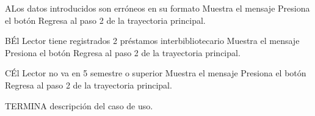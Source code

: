 		\begin{UCtrayectoriaA}{A}{Los datos introducidos son erróneos en su formato}
			\UCpaso[\UCsist] Muestra el mensaje 
			\UCpaso[\UCactor] Presiona el botón 
			\UCpaso[\UCsist] Regresa al paso 2 de la trayectoria principal.
		\end{UCtrayectoriaA}
		\begin{UCtrayectoriaA}{B}{Él Lector tiene registrados 2 préstamos interbibliotecario}
			\UCpaso[\UCsist] Muestra el mensaje 
			\UCpaso[\UCactor] Presiona el botón 
			\UCpaso[\UCsist] Regresa al paso 2 de la trayectoria principal.
		\end{UCtrayectoriaA}
		\begin{UCtrayectoriaA}{C}{Él Lector no va en 5 semestre o superior}
			\UCpaso[\UCsist] Muestra el mensaje 
			\UCpaso[\UCactor] Presiona el botón 
			\UCpaso[\UCsist] Regresa al paso 2 de la trayectoria principal.
		\end{UCtrayectoriaA}
		
TERMINA descripción del caso de uso.


